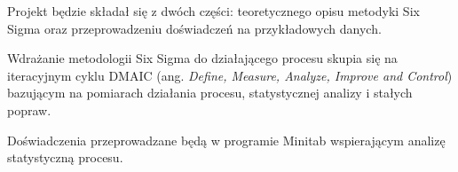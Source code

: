 Projekt będzie składał się z dwóch części: teoretycznego
opisu metodyki Six Sigma oraz
przeprowadzeniu doświadczeń na przykładowych danych.

Wdrażanie metodologii Six Sigma do działającego procesu
skupia się na iteracyjnym cyklu DMAIC (ang. \textit{Define, Measure, Analyze, Improve and Control}) bazującym na pomiarach działania procesu, statystycznej analizy i stałych 
popraw.

Doświadczenia przeprowadzane będą w programie Minitab wspierającym analizę statystyczną procesu.